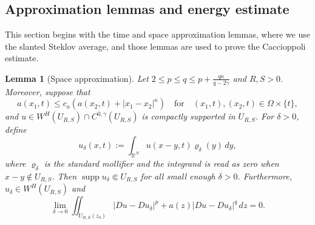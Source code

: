 \documentclass[notitlepage,11pt,reqno]{amsart}
\newtheorem{lemma}[theorem]{Lemma}
\theoremstyle{definition}
\numberwithin{equation}{section}
\newcommand{\RR}{\mathds{R}}
\DeclareMathOperator*{\supp}{supp}
\begin{document}
 \subsection{Approximation lemmas and energy estimate} This section begins with the time and space approximation lemmas, where we use the slanted Steklov average, and those lemmas are used to prove the Caccioppoli estimate.
 \begin{lemma}[Space approximation]\label{lem: spcae approximation}
Let $2\leq p\leq q\leq p+\frac{q\kappa}{q-2\gamma}$ and $R,S>0$. Moreover, suppose
that 
\[a(x_1, t)\leq c_a \left(a(x_2, t)+|x_1-x_2|^{\kappa}\right)\quad \text{for}\quad (x_1, t), (x_2, t)\in \Omega\times \{t\},\] and 
$u\in W^{H}(U_{R, S})\cap C^{0, \gamma}(U_{R, S})$ is compactly
supported in $U_{R, S}$. For $\delta>0$, define
\[
u_{\delta}(x,t):=\int_{\RR^{N}}u\left(x-y,t\right)\varrho_{\delta}(y)\,dy,
\]
where $\varrho_{\delta}$ is the standard mollifier and the integrand
is read as zero when $x-y\not\in U_{R, S}$. Then $\supp u_{\delta}\Subset U_{R, S}$
for all small enough $\delta>0$. Furthermore, $u_{\delta}\in W^{H}(U_{R, S})$ and
\begin{equation}
\lim_{\delta\rightarrow0}\iint_{U_{R, S}(z_0)}\left|Du-Du_{\delta}\right|^{p}+a(z)\left|Du-Du_{\delta}\right|^{q}\, dz=0.\label{eq:space approx grad conv}
\end{equation}
\end{lemma}
\end{document}
